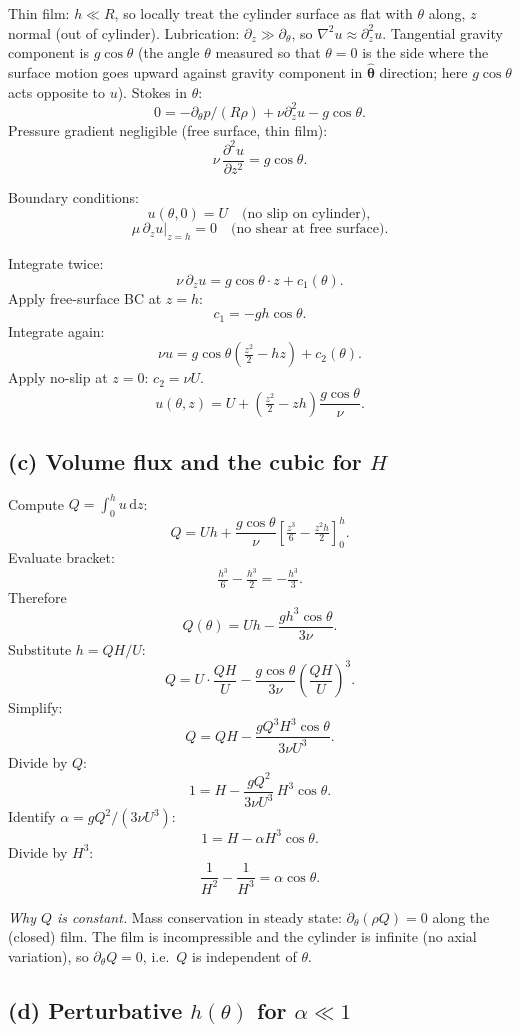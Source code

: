 \documentclass[11pt]{article}
\newcommand{\de}{\mathrm{d}}
\newcommand{\pdd}[2]{\frac{\partial^{2} #1}{\partial #2^{2}}}
\newcommand{\Lap}{\nabla^{2}}
\begin{document}
Thin film: $h \ll R$, so locally treat the cylinder surface as flat with $\theta$ along, $z$ normal (out of cylinder). Lubrication: $\partial_z \gg \partial_\theta$, so $\Lap u \approx \partial_z^2 u$. Tangential gravity component is $g\cos\theta$ (the angle $\theta$ measured so that $\theta=0$ is the side where the surface motion goes upward against gravity component in $\hat{\bm\theta}$ direction; here $g\cos\theta$ acts opposite to $u$). Stokes in $\theta$:
\[ 0 = -\partial_\theta p/(R\rho) + \nu\partial_z^2 u - g\cos\theta. \]
Pressure gradient negligible (free surface, thin film):
\[ \boxed{\;\nu\,\pdd{u}{z} = g\cos\theta.\;} \]

Boundary conditions:
\[ u(\theta,0) = U\quad\text{(no slip on cylinder)}, \]
\[ \mu\,\partial_z u\big|_{z=h} = 0\quad\text{(no shear at free surface)}. \]

Integrate twice:
\[ \nu\,\partial_z u = g\cos\theta\cdot z + c_1(\theta). \]
Apply free-surface BC at $z=h$:
\[ c_1 = -g h\cos\theta. \]
Integrate again:
\[ \nu u = g\cos\theta\!\left(\tfrac{z^2}{2} - h z\right) + c_2(\theta). \]
Apply no-slip at $z=0$: $c_2 = \nu U$.
\[ \boxed{\;u(\theta,z) = U + \!\left(\tfrac{z^2}{2}-zh\right)\!\frac{g\cos\theta}{\nu}.\;} \]

\subsection*{(c) Volume flux and the cubic for $H$}

Compute $Q = \int_0^h u\,\de z$:
\[ Q = U h + \frac{g\cos\theta}{\nu}\!\left[\tfrac{z^3}{6}-\tfrac{z^2 h}{2}\right]_0^h. \]
Evaluate bracket:
\[ \tfrac{h^3}{6} - \tfrac{h^3}{2} = -\tfrac{h^3}{3}. \]
Therefore
\[ Q(\theta) = Uh - \frac{g h^3 \cos\theta}{3\nu}. \]
Substitute $h = QH/U$:
\[ Q = U\cdot\frac{QH}{U} - \frac{g\cos\theta}{3\nu}\!\left(\frac{QH}{U}\right)^{\!3}. \]
Simplify:
\[ Q = QH - \frac{g Q^3 H^3 \cos\theta}{3\nu U^3}. \]
Divide by $Q$:
\[ 1 = H - \frac{g Q^2}{3\nu U^3}\, H^3\cos\theta. \]
Identify $\alpha = gQ^2/(3\nu U^3)$:
\[ 1 = H - \alpha H^3\cos\theta. \]
Divide by $H^3$:
\[ \boxed{\;\frac{1}{H^2} - \frac{1}{H^3} = \alpha\cos\theta.\;} \]

\textit{Why $Q$ is constant.} Mass conservation in steady state: $\partial_\theta(\rho Q)=0$ along the (closed) film. The film is incompressible and the cylinder is infinite (no axial variation), so $\partial_\theta Q = 0$, i.e.\ $Q$ is independent of $\theta$.

\subsection*{(d) Perturbative $h(\theta)$ for $\alpha\ll 1$}
\end{document}
